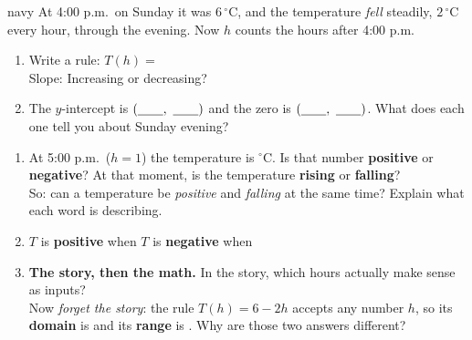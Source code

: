 \documentclass[10pt]{article}
\newcommand{\tempgrid}{%
  \draw[step=1, linegray!40, very thin] (0,-8) grid (7,8);
  \draw[->, semithick, charcoal] (0,0)--(7.6,0) node[right, font=\scriptsize]{$h$};
  \draw[->, semithick, charcoal] (0,-8.6)--(0,8.8) node[above, font=\scriptsize]{$T$ ($^\circ$C)};
  \foreach \x in {1,...,7} \node[charcoal, font=\tiny, below] at (\x,0){\x};
  \foreach \y in {-8,-6,-4,-2,2,4,6,8} \node[charcoal, font=\tiny, left] at (0,\y){\y};}
\begin{document}
\boxguard[22]
\begin{scenariobox}{navy}
At 4:00 p.m.\ on Sunday it was $6\,^\circ$C, and the temperature \emph{fell} steadily, $2\,^\circ$C
every hour, through the evening. Now $h$ counts the hours after 4:00 p.m.

\begin{minipage}[t]{0.56\linewidth}
\vspace{0pt}
\begin{enumerate}[label=\textbf{\alph*.}, leftmargin=1.8em, itemsep=5pt]
  \item Write a rule: \; $T(h) = $ \blank{3.0cm} \\[2pt]
        Slope: \blank{1.4cm} \quad Increasing or decreasing? \blank{2.4cm}
  \item The $y$-intercept is $(\blank{0.7cm},\ \blank{0.7cm})$ and the zero is
        $(\blank{0.7cm},\ \blank{0.7cm})$. What does each one tell you about Sunday evening?
\end{enumerate}
\end{minipage}\hfill
\begin{minipage}[t]{0.40\linewidth}
\vspace{0pt}\centering
{}
\end{minipage}

\begin{enumerate}[label=\textbf{\alph*.}, start=3, leftmargin=1.8em, itemsep=5pt]
  \item At 5:00 p.m.\ ($h=1$) the temperature is \blank{1.1cm} $^\circ$C. Is that number
        \textbf{positive} or \textbf{negative}? \blank{2.0cm} \; At that moment, is the
        temperature \textbf{rising} or \textbf{falling}? \blank{2.0cm} \\[3pt]
        So: can a temperature be \emph{positive} and \emph{falling} at the same time? Explain what
        each word is describing.
  \item $T$ is \textbf{positive} when \blank{2.6cm} \qquad
        $T$ is \textbf{negative} when \blank{2.6cm}
  \item \textbf{The story, then the math.} In the story, which hours actually make sense as inputs?
        \blank{3.8cm} \\[3pt]
        Now \emph{forget the story}: the rule $T(h)=6-2h$ accepts any number $h$, so its
        \textbf{domain} is \blank{2.6cm} and its \textbf{range} is \blank{2.6cm}.
        Why are those two answers different?
\end{enumerate}
\end{scenariobox}
\end{document}
